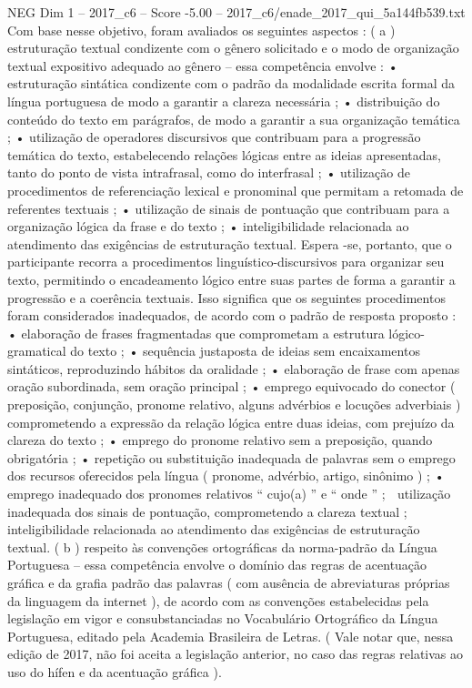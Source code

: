 \begin{textsample}{NEG Dim 1 – 2017\_c6 – Score -5.00 – 2017\_c6/enade\_2017\_qui\_5a144fb539.txt}
Com base nesse objetivo, foram avaliados os seguintes aspectos : ( a ) estruturação textual condizente com o gênero solicitado e o modo de organização textual expositivo adequado ao gênero – essa competência envolve : • estruturação sintática condizente com o padrão da modalidade escrita formal da língua portuguesa de modo a garantir a clareza necessária ; • distribuição do conteúdo do texto em parágrafos, de modo a garantir a sua organização temática ; • utilização de operadores discursivos que contribuam para a progressão temática do texto, estabelecendo relações lógicas entre as ideias apresentadas, tanto do ponto de vista intrafrasal, como do interfrasal ; • utilização de procedimentos de referenciação lexical e pronominal que permitam a retomada de referentes textuais ; • utilização de sinais de pontuação que contribuam para a organização lógica da frase e do texto ; • inteligibilidade relacionada ao atendimento das exigências de estruturação textual.
Espera -se, portanto, que o participante recorra a procedimentos linguístico-discursivos para organizar seu texto, permitindo o encadeamento lógico entre suas partes de forma a garantir a progressão e a coerência textuais.
Isso significa que os seguintes procedimentos foram considerados inadequados, de acordo com o padrão de resposta proposto : • elaboração de frases fragmentadas que comprometam a estrutura lógico-gramatical do texto ; • sequência justaposta de ideias sem encaixamentos sintáticos, reproduzindo hábitos da oralidade ; • elaboração de frase com apenas oração subordinada, sem oração principal ; • emprego equivocado do conector ( preposição, conjunção, pronome relativo, alguns advérbios e locuções adverbiais ) comprometendo a expressão da relação lógica entre duas ideias, com prejuízo da clareza do texto ; • emprego do pronome relativo sem a preposição, quando obrigatória ; • repetição ou substituição inadequada de palavras sem o emprego dos recursos oferecidos pela língua ( pronome, advérbio, artigo, sinônimo ) ; • emprego inadequado dos pronomes relativos “ cujo(a) ” e “ onde ” ;  utilização inadequada dos sinais de pontuação, comprometendo a clareza textual ;  inteligibilidade relacionada ao atendimento das exigências de estruturação textual. ( b ) respeito às convenções ortográficas da norma-padrão da Língua Portuguesa – essa competência envolve o domínio das regras de acentuação gráfica e da grafia padrão das palavras ( com ausência de abreviaturas próprias da linguagem da internet ), de acordo com as convenções estabelecidas pela legislação em vigor e consubstanciadas no Vocabulário Ortográfico da Língua Portuguesa, editado pela Academia Brasileira de Letras. ( Vale notar que, nessa edição de 2017, não foi aceita a legislação anterior, no caso das regras relativas ao uso do hífen e da acentuação gráfica ).

\end{textsample}
